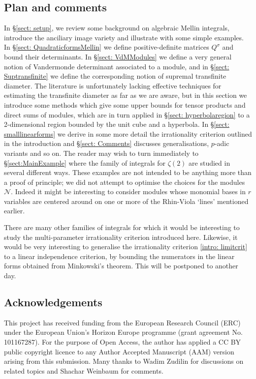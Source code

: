 \documentclass[a4paper,10pt]{amsart}
\theoremstyle{definition}
\theoremstyle{remark}
\numberwithin{equation}{section}
\newcommand{\0}{\color{blue}{\mathsf{0}}}
\begin{document}
\subsection{Plan and comments}
In \S\ref{sect: setup}, we review some background on algebraic Mellin integrals, introduce the anciliary image variety and illustrate with some simple examples. In \S\ref{sect: QuadraticformsMellin} we define positive-definite matrices $Q^{\sigma}$ and bound their determinants.  In \S\ref{sect: VdMModules}  we define a very general notion of Vandermonde determinant associated to a module, 
and in \S\ref{sect: Suptransfinite} we define the corresponding notion of supremal transfinite diameter.  The literature is unfortunately lacking effective techniques for estimating the transfinite diameter as far as we are aware, but in this section we introduce some methods which give some upper  bounds for tensor products and direct sums of modules, which are in turn applied in \S\ref{sect: hyperbolaregion} to a 2-dimensional region bounded by the unit cube and a hyperbola.   In \S\ref{sect: smalllinearforms} we derive in some more detail the irrationality criterion  outlined in the introduction and \S\ref{sect: Comments} discusses generalisations, $p$-adic variants and so on. The reader may wish to turn immediately to \S\ref{sect:MainExample} where the family of integrals for $\zeta(2)$ are studied in several different ways.  These examples are not intended to be anything more than a proof of principle; we did not attempt to optimise the choices for the modules $\mathcal{N}$. Indeed it might be interesting to consider modules  whose monomial bases  in $r$ variables   are centered around  on one or more of the Rhin-Viola `lines' mentioned earlier.

There are many other families of integrals for which it would be interesting to study the multi-parameter irrationality criterion introduced here. Likewise, it would be very interesting to generalise the irrationality criterion \ref{intro: limitcrit} to a linear independence criterion, by bounding the numerators in the linear forms obtained from Minkowski's theorem. This will be postponed to another day.
 
 
 \subsection{Acknowledgements}
  This project has received funding from the European Research Council (ERC) 
  under the European Union's Horizon Europe programme
  (grant agreement No. 101167287).  
   For the purpose of Open Access, the  author has applied a CC BY public copyright licence to any Author Accepted Manuscript (AAM) version arising from this submission. 
   Many thanks to Wadim Zudilin for  discussions on related topics and Shachar Weinbaum for comments.  
 
\end{document}
